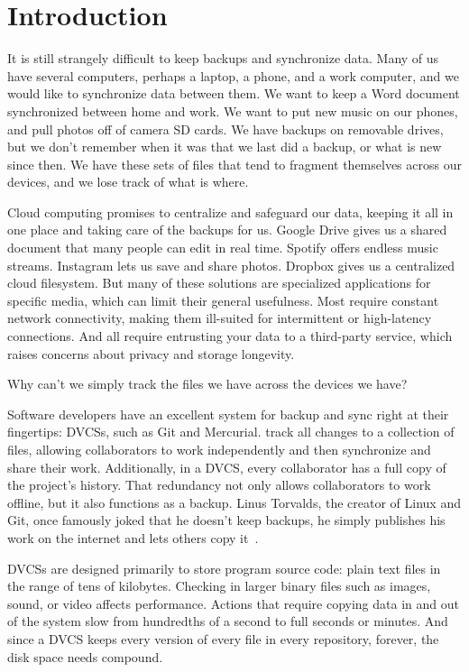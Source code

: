\chapter{Introduction}

It is still strangely difficult to keep backups and synchronize data. Many of us
have several computers, perhaps a laptop, a phone, and a work computer, and we
would like to synchronize data between them. We want to keep a Word document
synchronized between home and work. We want to put new music on our phones, and
pull photos off of camera SD cards. We have backups on removable drives, but we
don't remember when it was that we last did a backup, or what is new since then.
We have these sets of files that tend to fragment themselves across our devices,
and we lose track of what is where.

Cloud computing promises to centralize and safeguard our data, keeping it all in
one place and taking care of the backups for us. Google Drive gives us a shared
document that many people can edit in real time. Spotify offers endless music
streams. Instagram lets us save and share photos. Dropbox gives us a centralized
cloud filesystem. But many of these solutions are specialized applications for
specific media, which can limit their general usefulness. Most require constant
network connectivity, making them ill-suited for intermittent or high-latency
connections. And all require entrusting your data to a third-party service,
which raises concerns about privacy and storage longevity.

Why can't we simply track the files we have across the devices we have?


Software developers have an excellent system for backup and sync right at their
fingertips: \glspl{DVCS}, such as Git and Mercurial.  track all
changes to a collection of files, allowing collaborators to work independently
and then synchronize and share their work. Additionally, in a \gls{DVCS}, every
collaborator has a full copy of the project's history. That redundancy not only
allows collaborators to work offline, but it also functions as a backup. Linus
Torvalds, the creator of Linux and Git, once famously joked that he doesn't keep
backups, he simply publishes his work on the internet and lets others copy
it~\cite{linus_no_backups}.

\glspl{DVCS} are designed primarily to store program source code: plain text
files in the range of tens of kilobytes. Checking in larger binary files such as
images, sound, or video affects performance. Actions that require copying data
in and out of the system slow from hundredths of a second to full seconds or
minutes. And since a \gls{DVCS} keeps every version of every file in every
\gls{repository}, forever, the disk space needs compound.

